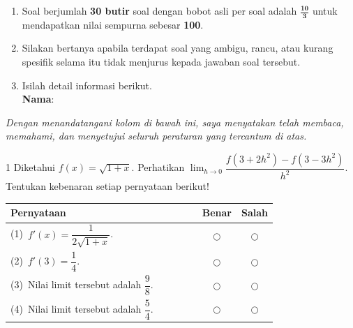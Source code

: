 \documentclass[11pt]{article}
\begin{document}
\begin{enumerate}[leftmargin=*,itemsep=4pt,topsep=4pt]
  \item Soal berjumlah \textbf{30 butir} soal dengan bobot asli per soal adalah
        $\mathbf{\tfrac{10}{3}}$ untuk mendapatkan nilai sempurna sebesar \textbf{100}.

  \item Silakan bertanya apabila terdapat soal yang ambigu, rancu, atau kurang
        spesifik selama itu tidak menjurus kepada jawaban soal tersebut.

  \item Isilah detail informasi berikut.\\[0.3em]
        \textbf{Nama}\hspace{0.45cm}:\enspace\underline{\hspace{8cm}}
\end{enumerate}

\vspace{0.6cm}
\noindent\textit{Dengan menandatangani kolom di bawah ini, saya menyatakan telah membaca,
memahami, dan menyetujui seluruh peraturan yang tercantum di atas.}

\vspace{0.6cm}
\noindent{}

\clearpage


\begin{soal}{1}
Diketahui $f(x)=\sqrt{1+x}$. Perhatikan
$\displaystyle\lim_{h\to0}\dfrac{f(3+2h^2)-f(3-3h^2)}{h^2}$.
Tentukan kebenaran setiap pernyataan berikut!

\par\smallskip
{\renewcommand{\arraystretch}{1.4}%
\begin{tabular}{@{}p{0.76\linewidth}cc@{}}
\hline
\textbf{Pernyataan} & \textbf{Benar} & \textbf{Salah}\\
\hline
(1)~$f'(x) = \dfrac{1}{2\sqrt{1+x}}$.
  & $\bigcirc$ & $\bigcirc$\\
(2)~$f'(3) = \dfrac{1}{4}$.
  & $\bigcirc$ & $\bigcirc$\\
(3)~Nilai limit tersebut adalah $\dfrac{9}{8}$.
  & $\bigcirc$ & $\bigcirc$\\
(4)~Nilai limit tersebut adalah $\dfrac{5}{4}$.
  & $\bigcirc$ & $\bigcirc$\\
\hline
\end{tabular}}
\end{soal}
\end{document}
